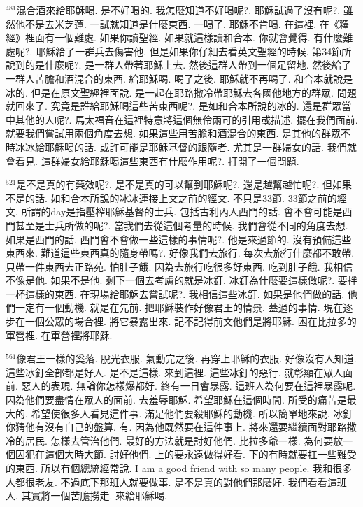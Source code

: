 \documentclass{book}
\begin{document}
$^{481}$混合酒來給耶穌喝.
是不好喝的.
我怎麼知道不好喝呢?.
耶穌試過了沒有呢?.
雖然他不是去米芝蓮.
一試就知道是什麼東西.
一喝了.
耶穌不肯喝.
在這裡.
在《釋經》裡面有一個難處.
如果你讀聖經.
如果就這樣讀和合本.
你就會覺得.
有什麼難處呢?.
耶穌給了一群兵去傷害他.
但是如果你仔細去看英文聖經的時候.
第34節所說到的是什麼呢?.
是一群人帶著耶穌上去.
然後這群人帶到一個足留地.
然後給了一群人苦膽和酒混合的東西.
給耶穌喝.
喝了之後.
耶穌就不再喝了.
和合本就說是冰的.
但是在原文聖經裡面說.
是一起在耶路撒冷帶耶穌去各國他地方的群眾.
問題就回來了.
究竟是誰給耶穌喝這些苦東西呢?.
是如和合本所說的冰的.
還是群眾當中其他的人呢?.
馬太福音在這裡特意將這個無伶兩可的引用或描述.
擺在我們面前.
就要我們嘗試用兩個角度去想.
如果這些用苦膽和酒混合的東西.
是其他的群眾不時冰冰給耶穌喝的話.
或許可能是耶穌基督的跟隨者.
尤其是一群婦女的話.
我們就會看見.
這群婦女給耶穌喝這些東西有什麼作用呢?.
打開了一個問題.

$^{521}$是不是真的有藥效呢?.
是不是真的可以幫到耶穌呢?.
還是越幫越忙呢?.
但如果不是的話.
如和合本所說的冰冰連接上文之前的經文.
不只是33節.
33節之前的經文.
所謂的day是指壓榨耶穌基督的士兵.
包括古利內人西門的話.
會不會可能是西門甚至是士兵所做的呢?.
當我們去從這個考量的時候.
我們會從不同的角度去想.
如果是西門的話.
西門會不會做一些這樣的事情呢?.
他是來過節的.
沒有預備這些東西來.
難道這些東西真的隨身帶嗎?.
好像我們去旅行.
每次去旅行什麼都不敢帶.
只帶一件東西去正路苑.
怕肚子餓.
因為去旅行吃很多好東西.
吃到肚子餓.
我相信不像是他.
如果不是他.
剩下一個去考慮的就是冰釘.
冰釘為什麼要這樣做呢?.
要拌一杯這樣的東西.
在現場給耶穌去嘗試呢?.
我相信這些冰釘.
如果是他們做的話.
他們一定有一個動機.
就是在先前.
把耶穌裝作好像君王的情景.
蓋過的事情.
現在逐步在一個公眾的場合裡.
將它暴露出來.
記不記得前文他們是將耶穌.
困在比拉多的軍營裡.
在軍營裡將耶穌.

$^{561}$像君王一樣的奚落.
脫光衣服.
氣動完之後.
再穿上耶穌的衣服.
好像沒有人知道.
這些冰釘全部都是好人.
是不是這樣.
來到這裡.
這些冰釘的惡行.
就彰顯在眾人面前.
惡人的表現.
無論你怎樣爆都好.
終有一日會暴露.
這班人為何要在這裡暴露呢.
因為他們要盡情在眾人的面前.
去羞辱耶穌.
希望耶穌在這個時間.
所受的痛苦是最大的.
希望使很多人看見這件事.
滿足他們要殺耶穌的動機.
所以簡單地來說.
冰釘你猜他有沒有自己的盤算.
有.
因為他既然要在這件事上.
將來還要繼續面對耶路撒冷的居民.
怎樣去管治他們.
最好的方法就是討好他們.
比拉多爺一樣.
為何要放一個囚犯在這個大時大節.
討好他們.
上的要永遠做得好看.
下的有時就要扛一些難受的東西.
所以有個總統經常說.
I am a good friend with so many people.
我和很多人都很老友.
不過底下那班人就要做事.
是不是真的對他們那麼好.
我們看看這班人.
其實將一個苦膽撈走.
來給耶穌喝.
\end{document}
